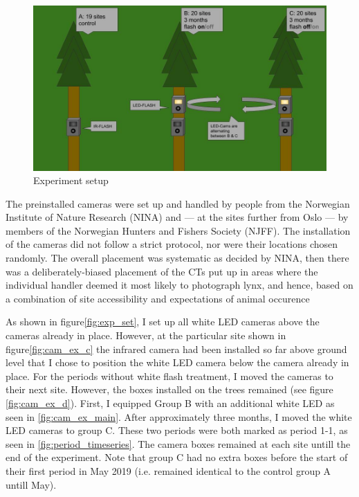 \begin{figure}
    \begin{center}
    	\includegraphics[scale=0.3]{./img/experiment_setup.jpg} %
    \end{center}
    	\caption{Experiment setup}
    \label{fig:exp_set}
\end{figure}


The preinstalled cameras were set up and handled by people from the Norwegian Institute of Nature Research (NINA) and --- at the sites further from Oslo  --- by members of the Norwegian Hunters and Fishers Society (NJFF). 
The installation of the cameras did not follow a strict protocol, nor were their locations chosen randomly. The overall placement was systematic as decided by NINA, then there was a deliberately-biased placement of the CTs put up in areas where the individual handler deemed it most likely to photograph lynx, and hence, based on a combination of site accessibility and expectations of animal occurence %


As shown in figure\vref{fig:exp_set}, I set up all white LED cameras above the cameras already in place. 
However, at the particular site shown in figure\vref{fig:cam_ex_c} the infrared camera had been installed so far above ground level that I chose to position the white LED camera below the camera already in place. %
For the periods without white flash treatment, I moved the cameras to their next site. However, the boxes installed on the trees remained (see figure \ref{fig:cam_ex_d}).
First, I equipped Group B with an additional white LED as seen in \vref{fig:cam_ex_main}. After approximately three months, I moved the white LED cameras to group C. These two periods were both marked as period 1-1, as seen in \vref{fig:period_timeseries}. %
The camera boxes remained at each site untill the end of the experiment. Note that group C had no extra boxes before the start of their first period in May 2019 (i.e. remained identical to the control group A untill May). 

